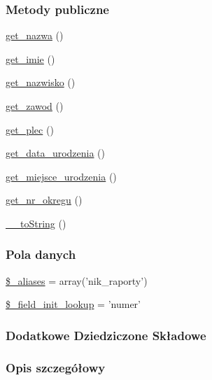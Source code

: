 \subsubsection*{Metody publiczne}
\begin{DoxyCompactItemize}
\item 
\hyperlink{classep___n_i_k___raport_ac0818f0049d7b84f08f77128f54cee36}{get\-\_\-nazwa} ()
\item 
\hyperlink{classep___n_i_k___raport_ac4b0c85dc2a130038f2d118dbd0c3d77}{get\-\_\-imie} ()
\item 
\hyperlink{classep___n_i_k___raport_abdd1d7ff92508da7f748ba1feec97af0}{get\-\_\-nazwisko} ()
\item 
\hyperlink{classep___n_i_k___raport_af80ca8310b60004454dd02a387deaa2c}{get\-\_\-zawod} ()
\item 
\hyperlink{classep___n_i_k___raport_ac7f9af5c3fa024e4c26a7b6bd4ce4bb4}{get\-\_\-plec} ()
\item 
\hyperlink{classep___n_i_k___raport_a880b240cd2d8c336fd1709bf0cb1ae2c}{get\-\_\-data\-\_\-urodzenia} ()
\item 
\hyperlink{classep___n_i_k___raport_ac57c08ec5e394a19c5bd9280c8376182}{get\-\_\-miejsce\-\_\-urodzenia} ()
\item 
\hyperlink{classep___n_i_k___raport_a2645a9f0aa5b0ccc482943348c033d0a}{get\-\_\-nr\-\_\-okregu} ()
\item 
\hyperlink{classep___n_i_k___raport_a7516ca30af0db3cdbf9a7739b48ce91d}{\-\_\-\-\_\-to\-String} ()
\end{DoxyCompactItemize}
\subsubsection*{Pola danych}
\begin{DoxyCompactItemize}
\item 
\hyperlink{classep___n_i_k___raport_ab4e31d75f0bc5d512456911e5d01366b}{\$\-\_\-aliases} = array('nik\-\_\-raporty')
\item 
\hyperlink{classep___n_i_k___raport_a4a4d54ae35428077a7c61ec8a5139af3}{\$\-\_\-field\-\_\-init\-\_\-lookup} = 'numer'
\end{DoxyCompactItemize}
\subsubsection*{Dodatkowe Dziedziczone Składowe}


\subsubsection{Opis szczegółowy}



